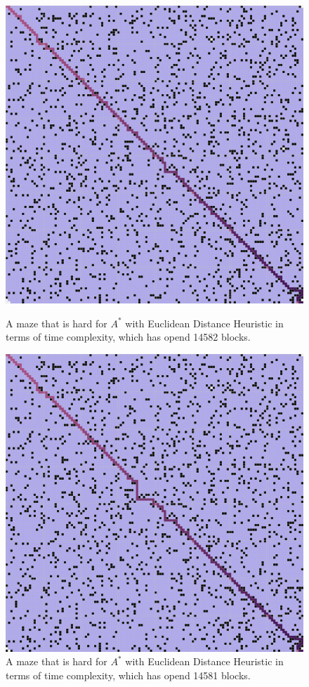 \documentclass[letter]{article}
\begin{document}
\begin{enumerate}[resume]
\begin{enumerate}
\begin{enumerate}
\begin{figure}
					\includegraphics[width=\textwidth]{../pics/aeb/14582.png}
					\caption{\label{fig:aeb2}A maze that is hard for $ A^* $ with Euclidean Distance Heuristic in terms of time complexity, which has opend 14582 blocks.}
					\endminipage\hfill
					\includegraphics[width=\textwidth]{../pics/aeb/14581.png}
					\caption{\label{fig:aeb3} A maze that is hard for $ A^* $ with Euclidean Distance Heuristic in terms of time complexity, which has opend 14581 blocks.}
					\endminipage
					\endminipage 
				\end{figure}
				

\end{enumerate}
\end{enumerate}
\end{enumerate}
\end{document}
